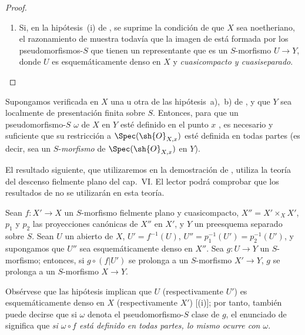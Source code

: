 \begin{proof}
\begin{remarks}[20.3.8.7]
\begin{enumerate}[label=(\roman*)]
  \item Si, en la hipótesis~(i) de , se suprime la condición de que $X$ sea noetheriano, el razonamiento de  muestra todavía que la imagen de  está formada por los pseudomorfismos-$S$ que tienen un representante que es un $S$-morfismo $U\to Y$, donde $U$ es esquemáticamente denso en $X$ y \emph{cuasicompacto y cuasiseparado}.
\end{enumerate}
\end{remarks}
\end{proof}

\begin{corollary}[20.3.9]
\label{IV.20.3.9}
Supongamos verificada en $X$ una u otra de las hipótesis~\textup{a)},~\textup{b)} de , y que $Y$ sea localmente de presentación finita sobre $S$.
Entonces, para que un pseudomorfismo-$S$ $\omega$ de $X$ en $Y$ esté definido en el punto $x$ , es necesario y suficiente que su restricción a $\Spec(\sh{O}_{X,x})$ esté definida en todas partes \textup{(es decir, sea un $S$-\emph{morfismo} de $\Spec(\sh{O}_{X,x})$ en $Y$)}.
\end{corollary}

El resultado siguiente, que utilizaremos en la demostración de , utiliza la teoría del descenso fielmente plano del cap.~VI.
El lector podrá comprobar que los resultados de  no se utilizarán en esta teoría.

\begin{lemma}[20.3.10]
\label{IV.20.3.10}
Sean $f:X'\to X$ un $S$-morfismo fielmente plano y cuasicompacto, $X''=X'\times_X X'$, $p_1$ y $p_2$ las proyecciones canónicas de $X''$ en $X'$, y $Y$ un preesquema separado sobre $S$.
Sean $U$ un abierto de $X$, $U'=f^{-1}(U)$, $U''=p_1^{-1}(U')=p_2^{-1}(U')$, y supongamos que $U''$ sea esquemáticamente denso en $X''$.
Sea $g:U\to Y$ un $S$-morfismo; entonces, si $g\circ(f|U')$ se prolonga a un $S$-morfismo $X'\to Y$, $g$ se prolonga a un $S$-morfismo $X\to Y$.
\end{lemma}

Obsérvese que las hipótesis implican que $U$ (respectivamente $U'$) es esquemáticamente denso en $X$ (respectivamente $X'$) [(i)]; por tanto, también puede decirse que si $\omega$ denota el pseudomorfismo-$S$ clase de $g$, el enunciado de  significa que \emph{si $\omega\circ f$ está definido en todas partes, lo mismo ocurre con $\omega$}.

